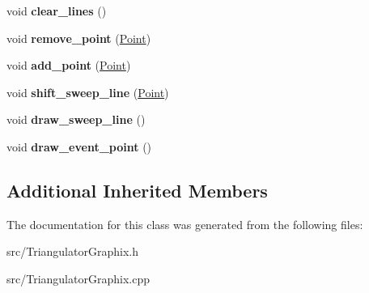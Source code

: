 \begin{DoxyCompactItemize}
void {\bfseries clear\+\_\+lines} ()
\item 
\mbox{\label{classTriangulatorGraphix_a121706605d0a40158c30c51ce9618766}} 
void {\bfseries remove\+\_\+point} (\hyperlink{classPoint}{Point})
\item 
\mbox{\label{classTriangulatorGraphix_a737ff01c92018f8d851bf208ecb168c7}} 
void {\bfseries add\+\_\+point} (\hyperlink{classPoint}{Point})
\item 
\mbox{\label{classTriangulatorGraphix_aef251828c73c3680f45cd85647a91ca7}} 
void {\bfseries shift\+\_\+sweep\+\_\+line} (\hyperlink{classPoint}{Point})
\item 
\mbox{\label{classTriangulatorGraphix_a991ef84f1da9285dbc5898292df0018b}} 
void {\bfseries draw\+\_\+sweep\+\_\+line} ()
\item 
\mbox{\label{classTriangulatorGraphix_afedbf3f67170f8eae323522a0a6f74ad}} 
void {\bfseries draw\+\_\+event\+\_\+point} ()
\end{DoxyCompactItemize}
\subsection*{Additional Inherited Members}


The documentation for this class was generated from the following files\+:\begin{DoxyCompactItemize}
\item 
src/Triangulator\+Graphix.\+h\item 
src/Triangulator\+Graphix.\+cpp\end{DoxyCompactItemize}
